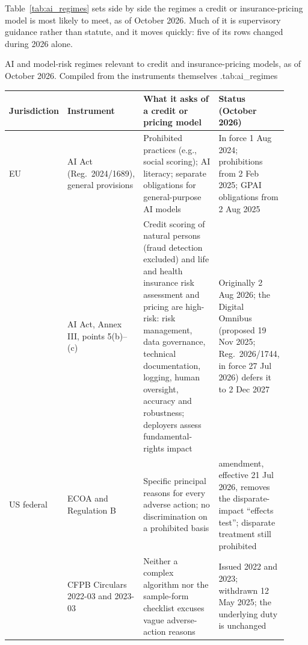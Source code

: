\documentclass[../ai_in_finance]{subfiles}
\begin{document}
Table~\ref{tab:ai_regimes} sets side by side the regimes a credit or insurance-pricing model is most likely to meet, as of October 2026. Much of it is supervisory guidance rather than statute, and it moves quickly: five of its rows changed during 2026 alone.

\begin{booktable}{AI and model-risk regimes relevant to credit and insurance-pricing models, as of October 2026. Compiled from the instruments themselves \parencite{eu2024aiact,eu2026omnibus,cfpb2026regb,cfpb2022circular,cfpb2023circular,cfpb2025withdrawal,frb2026revised,eo2025disparate,colorado2026admt,nydfs2024circular,pra2023ss123,fca2022consumerduty,osfi2025e23,mas2026airm,china2021pipl}.}{tab:ai_regimes}
\footnotesize
\begin{tabular}{@{}>{\raggedright\arraybackslash}p{0.09\linewidth}>{\raggedright\arraybackslash}p{0.20\linewidth}>{\raggedright\arraybackslash}p{0.41\linewidth}>{\raggedright\arraybackslash}p{0.22\linewidth}@{}}
\toprule
Jurisdiction & Instrument & What it asks of a credit or pricing model & Status (October 2026) \\
\midrule
EU & AI Act (Reg.\ 2024/1689), general provisions & Prohibited practices (e.g., social scoring); AI literacy; separate obligations for general-purpose AI models & In force 1 Aug 2024; prohibitions from 2 Feb 2025; GPAI obligations from 2 Aug 2025 \\
 & AI Act, Annex III, points 5(b)--(c) & Credit scoring of natural persons (fraud detection excluded) and life and health insurance risk assessment and pricing are high-risk: risk management, data governance, technical documentation, logging, human oversight, accuracy and robustness; deployers assess fundamental-rights impact & Originally 2 Aug 2026; the Digital Omnibus (proposed 19 Nov 2025; Reg.\ 2026/1744, in force 27 Jul 2026) defers it to 2 Dec 2027 \\
\midrule
US federal & ECOA and Regulation B & Specific principal reasons for every adverse action; no discrimination on a prohibited basis & 2026 amendment, effective 21 Jul 2026, removes the disparate-impact ``effects test''; disparate treatment still prohibited \\
 & CFPB Circulars 2022-03 and 2023-03 & Neither a complex algorithm nor the sample-form checklist excuses vague adverse-action reasons & Issued 2022 and 2023; withdrawn 12 May 2025; the underlying duty is unchanged \\

\end{tabular}
\end{booktable}
\end{document}
